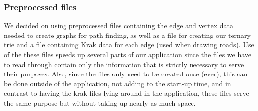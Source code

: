 \subsubsection{Preprocessed files}
We decided on using preprocessed files containing the edge and vertex data needed to create graphs for path finding, as well as a file for creating our ternary trie and a file containing Krak data for each edge (used when drawing roads). Use of the these files speeds up several parts of our application since the files we have to read through contain only the information that is strictly necessary to serve their purposes. Also, since the files only need to be created once (ever), this can be done outside of the application, not adding to the start-up time, and in contrast to having the krak files lying around in the application, these files serve the same purpose but without taking up nearly as much space.